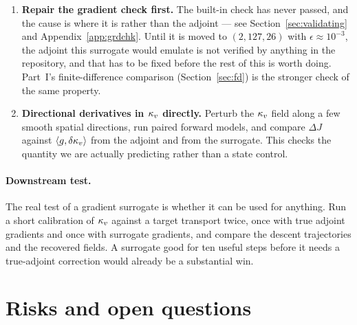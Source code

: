 \begin{enumerate}
  \item \textbf{Repair the gradient check first.} The built-in check has never
        passed, and the cause is where it is rather than the adjoint --- see
        Section~\ref{sec:validating} and Appendix~\ref{app:grdchk}. Until it is
        moved to $(2,127,26)$ with $\epsilon\approx10^{-3}$, the adjoint this
        surrogate would emulate is not verified by anything in the repository,
        and that has to be fixed before the rest of this is worth doing. Part~I's
        finite-difference comparison (Section~\ref{sec:fd}) is the stronger
        check of the same property.
  \item \textbf{Directional derivatives in $\kappa_{v}$ directly.} Perturb the $\kappa_{v}$
        field along a few smooth spatial directions, run paired forward models,
        and compare $\Delta J$ against $\langle g,\delta\kappa_{v}\rangle$ from the
        adjoint and from the surrogate. This checks the quantity we are
        actually predicting rather than a state control.
\end{enumerate}

\paragraph{Downstream test.} The real test of a gradient surrogate is whether
it can be used for anything. Run a short calibration of $\kappa_{v}$ against a target
transport twice, once with true adjoint gradients and once with surrogate
gradients, and compare the descent trajectories and the recovered fields. A
surrogate good for ten useful steps before it needs a true-adjoint correction
would already be a substantial win.

\section{Risks and open questions}
\label{sec:risks}

